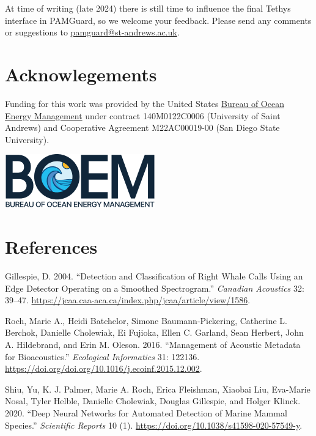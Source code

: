 \documentclass[
]{article}
\newlength{\cslhangindent}
\newenvironment{CSLReferences}[2] %
 {\begin{list}{}{%
  \setlength{\itemindent}{0pt}
  \setlength{\leftmargin}{0pt}
  \setlength{\parsep}{0pt}
  \ifodd #1
   \setlength{\leftmargin}{\cslhangindent}
   \setlength{\itemindent}{-1\cslhangindent}
  \fi
  \setlength{\itemsep}{#2\baselineskip}}}
 {\end{list}}
\begin{document}
At time of writing (late 2024) there is still time to influence the
final Tethys interface in PAMGuard, so we welcome your feedback. Please
send any comments or suggestions to
\href{mailto:pamguard@pamguard.org}{pamguard@st-andrews.ac.uk}.

\section{Acknowlegements}\label{acknowlegements}

Funding for this work was provided by the United States
\href{https://www.boem.gov/}{Bureau of Ocean Energy Management} under
contract 140M0122C0006 (University of Saint Andrews) and Cooperative
Agreement M22AC00019-00 (San Diego State University).

\href{https://www.boem.gov/}{\includegraphics[width=0.33\linewidth,height=\textheight,keepaspectratio]{media/BOEM_Logo_Web_Header.png}}

\section{References}\label{references}

\label{refs}
\begin{CSLReferences}{1}{0}
Gillespie, D. 2004. {``Detection and Classification of Right Whale Calls
Using an Edge Detector Operating on a Smoothed Spectrogram.''}
\emph{Canadian Acoustics} 32: 39--47.
\url{https://jcaa.caa-aca.ca/index.php/jcaa/article/view/1586}.

Roch, Marie A., Heidi Batchelor, Simone Baumann-Pickering, Catherine L.
Berchok, Danielle Cholewiak, Ei Fujioka, Ellen C. Garland, Sean Herbert,
John A. Hildebrand, and Erin M. Oleson. 2016. {``Management of Acoustic
Metadata for Bioacoustics.''} \emph{Ecological Informatics} 31: 122136.
\url{https://doi.org/doi.org/10.1016/j.ecoinf.2015.12.002}.

Shiu, Yu, K. J. Palmer, Marie A. Roch, Erica Fleishman, Xiaobai Liu,
Eva-Marie Nosal, Tyler Helble, Danielle Cholewiak, Douglas Gillespie,
and Holger Klinck. 2020. {``Deep Neural Networks for Automated Detection
of Marine Mammal Species.''} \emph{Scientific Reports} 10 (1).
\url{https://doi.org/10.1038/s41598-020-57549-y}.

\end{CSLReferences}
\end{document}
